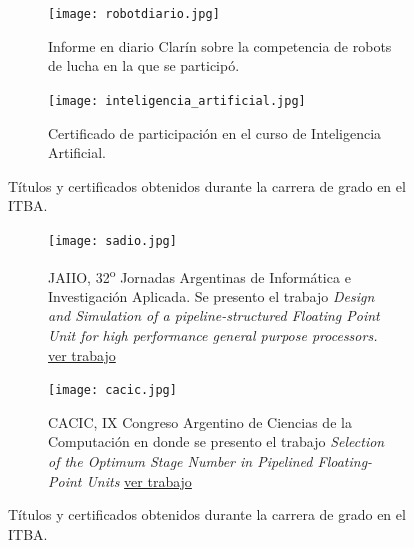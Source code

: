    \begin{figure}
      \begin{center}
      \ContinuedFloat
         \begin{subfigure}[b]{0.40\textwidth}
            \begin{center}
               \texttt{[image: robotdiario.jpg]}
               \caption{Informe en diario Clarín sobre la competencia de robots de lucha en la que se participó.}
               \label{fig:robotdiario}
            \end{center}
         \end{subfigure}%
         \hfill
         \begin{subfigure}[b]{0.55\textwidth}
            \texttt{[image: inteligencia\_artificial.jpg]}
            \caption{Certificado de participación en el curso de Inteligencia Artificial.}
            \label{fig:foto_ai}
         \end{subfigure}%
      \caption{Títulos y certificados obtenidos durante la carrera de grado en el ITBA.}
      \label{fig:titulos_del_itba}
      \end{center}
   \end{figure}

   \begin{figure}
      \begin{center}
      \ContinuedFloat
         \begin{subfigure}[b]{0.45\textwidth}
            \texttt{[image: sadio.jpg]}
            \caption{JAIIO, 32\textsuperscript{o} Jornadas Argentinas de Informática e Investigación Aplicada. Se presento el trabajo \emph{Design and Simulation of a pipeline-structured Floating Point Unit for high performance general purpose processors.} \href{https://drive.google.com/open?id=15NkqA_rWbaObx1uiqe7ruBg9lWpIh5q7}{ver trabajo}}
            \label{fig:jaiio}
         \end{subfigure}%
         \hfill
         \begin{subfigure}[b]{0.45\textwidth}
            \texttt{[image: cacic.jpg]}
            \caption{CACIC, IX Congreso Argentino de Ciencias de la Computación en donde se presento el trabajo \emph{Selection of the Optimum Stage Number in Pipelined Floating-Point Units} \href{https://drive.google.com/open?id=11z5qRrJ01Is6dx5NMHAOoXl3D0r2o8OY}{ver trabajo}}
            \label{fig:cacic}
         \end{subfigure}%
      \end{center}
      \caption{Títulos y certificados obtenidos durante la carrera de grado en el ITBA.}
      \label{fig:titulos_del_itba}
   \end{figure}

